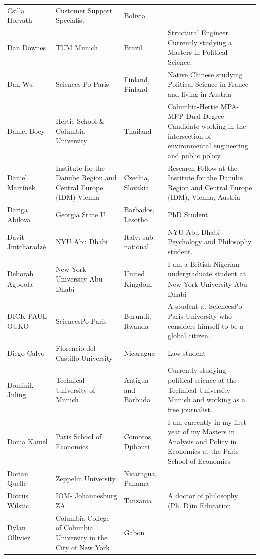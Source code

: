 \documentclass[
]{article}
\begin{document}
\begin{longtable}[t]{l>{\raggedright\arraybackslash}p{2cm}>{\raggedright\arraybackslash}p{2cm}>{\raggedright\arraybackslash}p{3cm}}
Csilla Horvath & Customer Support Specialist & Bolivia & \\
\rowcolor{gray!6}  Dan Downes & TUM Munich & Brazil & Structural Engineer. Currently studying a Masters in Political Science.\\
Dan Wu & Sciences Po Paris & Finland, Finland & Native Chinese studying Political Science in France and living in Austria\\
\rowcolor{gray!6}  Daniel Boey & Hertie School \& Columbia University & Thailand & Columbia-Hertie MPA-MPP Dual Degree Candidate working in the intersection of environmental engineering and public policy.\\
\addlinespace
Daniel Martínek & Institute for the Danube Region and Central Europe (IDM) Vienna & Czechia, Slovakia & Research Fellow at the Institute for the Danube Region and Central Europe (IDM), Vienna, Austria\\
\rowcolor{gray!6}  Dariga Abilova & Georgia State U & Barbados, Lesotho & PhD Student\\
Davit Jintcharadzé & NYU Abu Dhabi & Italy: sub-national & NYU Abu Dhabi Psychology and Philosophy student.\\
\rowcolor{gray!6}  Deborah Agboola & New York University Abu Dhabi & United Kingdom & I am a British-Nigerian undergraduate student at New York University Abu Dhabi\\
DICK PAUL OUKO & SciencesPo Paris & Burundi, Rwanda & A student at SciencesPo Paris University who considers himself to be a global citizen.\\
\addlinespace
\rowcolor{gray!6}  Diego Calvo & Florencio del Castillo University & Nicaragua & Law student\\
Dominik Juling & Technical University of Munich & Antigua and Barbuda & Currently studying political science at the Technical University Munich and working as a free journalist.\\
\rowcolor{gray!6}  Donia Kamel & Paris School of Economics & Comoros, Djibouti & I am currently in my first year of my Masters in Analysis and Policy in Economics at the Paris School of Economics\\
Dorian Quelle & Zeppelin University & Nicaragua, Panama & \\
\rowcolor{gray!6}  Dotrus Wilstic & IOM- Johannesburg ZA & Tanzania & A doctor of philosophy (Ph. D)in Education\\
\addlinespace
Dylan Ollivier & Columbia College of Columbia University in the City of New York & Gabon & \\

\end{longtable}
\end{document}
